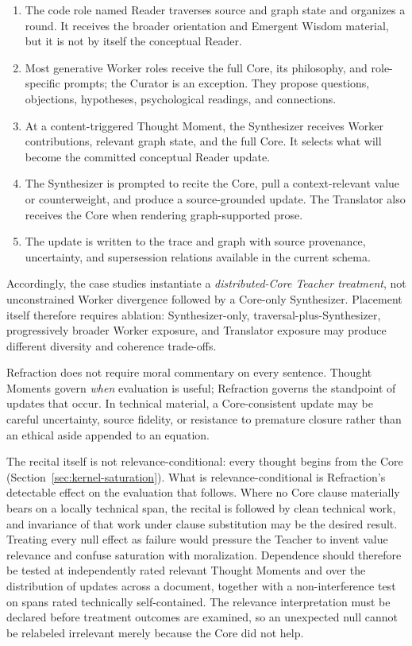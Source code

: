 \begin{enumerate}[leftmargin=*,itemsep=0.35em]
    \item The code role named Reader traverses source and graph state and
    organizes a round. It receives the broader orientation and Emergent Wisdom
    material, but it is not by itself the conceptual Reader.
    \item Most generative Worker roles receive the full Core, its philosophy,
    and role-specific prompts; the Curator is an exception. They propose
    questions, objections, hypotheses, psychological readings, and connections.
    \item At a content-triggered Thought Moment, the Synthesizer receives Worker
    contributions, relevant graph state, and the full Core. It selects what will
    become the committed conceptual Reader update.
    \item The Synthesizer is prompted to recite the Core, pull a
    context-relevant value or counterweight, and produce a source-grounded
    update. The Translator also receives the Core when rendering graph-supported
    prose.
    \item The update is written to the trace and graph with source provenance,
    uncertainty, and supersession relations available in the current schema.
\end{enumerate}

Accordingly, the case studies instantiate a
\emph{distributed-Core Teacher treatment}, not unconstrained Worker divergence
followed by a Core-only Synthesizer. Placement itself therefore requires
ablation: Synthesizer-only, traversal-plus-Synthesizer, progressively broader
Worker exposure, and Translator exposure may produce different diversity and
coherence trade-offs.

Refraction does not require moral commentary on every sentence. Thought Moments
govern \emph{when} evaluation is useful; Refraction governs the standpoint of
updates that occur. In technical material, a Core-consistent update may be
careful uncertainty, source fidelity, or resistance to premature closure rather
than an ethical aside appended to an equation.

The recital itself is not relevance-conditional: every thought begins from the
Core (Section~\ref{sec:kernel-saturation}). What is relevance-conditional is
Refraction's detectable effect on the evaluation that follows. Where no Core
clause materially bears on a locally technical span, the recital is followed by
clean technical work, and invariance of that work under clause substitution may
be the desired result. Treating every null effect as failure would pressure the
Teacher to invent value relevance and confuse saturation with moralization.
Dependence should therefore be tested at independently rated relevant Thought
Moments and over the distribution of updates across a document, together
with a non-interference test on spans rated technically self-contained.
The relevance interpretation must be declared before treatment outcomes
are examined, so an unexpected null cannot be relabeled irrelevant
merely because the Core did not help.

